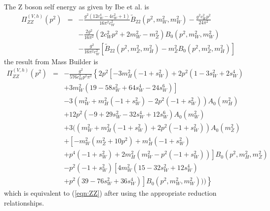\documentclass[11pt]{article}
\newcommand{\mb}{\textsf{Mass Builder} }
\begin{document}
The Z boson self energy as given by Ibe et al. \cite{Ibe2013a} is
{
\begin{eqnarray}
\Pi_{ZZ}^{(V,h)}(p^2) &=& 
-\frac{ g^2 (12c_W^4 - 4c_W^2 + 1) }{16\pi^2 c_W^2}
\tilde B_{22}(p^2, m_W^2, m_W^2) 
-\frac{ g^2 c_W^2 p^2 }{24\pi^2} \nonumber \\
&& -\frac{2g^2}{16\pi^2}(2c_W^2 p^2 + 2m_W^2 - m_Z^2)
B_0(p^2, m_W^2, m_W^2) \nonumber \\
&& -\frac{ g^2 }{16\pi^2 c_W^2}
[\tilde B_{22}(p^2, m_Z^2, m_H^2)\label{eqn:ZZ}
-m_Z^2 B_0(p^2, m_Z^2, m_H^2) ]
\end{eqnarray}
}
the result from \mb is
{
\begin{eqnarray}
\Pi_{ZZ}^{(V,h)}(p^2) &=& 
-\frac{ g^2} {576 c_W^4 p^2 \pi^2}\left\{
2 p^2 \left[-3 m_H^2 (-1 + s_W^2) + 2 p^2 (1 - 3 s_W^2 + 2 s_W^4) \right. \right.\nonumber\\
&& \left.+ 3 m_W^2 (19 - 58 s_W^2 + 64 s_W^4 - 24 s_W^6)\right] \nonumber\\
&&- 3 (m_W^2 + m_H^2 (-1 + s_W^2) - 2 p^2 (-1 + s_W^2)) A_0\left(m_H^2\right)  \nonumber\\
 &&  + 12 p^2 (-9 + 29 s_W^2 - 32 s_W^4 + 12 s_W^6) A_0\left(m_W^2\right)  \nonumber\\
   && +3 ((m_W^2 + m_H^2 (-1 + s_W^2) + 2 p^2 (-1 + s_W^2)) A_0\left(m_Z^2\right)  \nonumber\\
   &&+ \left[-m_W^2 (m_Z^2 + 10 p^2) + m_H^4 (-1 + s_W^2)\right.  \nonumber\\
   && \left. +     p^4 (-1 + s_W^2) + 2 m_H^2 (m_W^2 - p^2 (-1 + s_W^2))\right] B_0\left(p^2, m_H^2, m_Z^2\right)  \nonumber\\
&&   -    p^2 (-1 + s_W^2) \left[4 m_W^2 (15 - 32 s_W^2 + 12 s_W^4)\right.  \nonumber\\
&&  \left.      \left. +  p^2 (39 - 76 s_W^2 + 36 s_W^4)\right] B_0\left(p^2, m_W^2, m_W^2\right)))\right\}
\end{eqnarray}
}
which is equivalent to (\ref{eqn:ZZ}) after using the appropriate reduction relationships.
\end{document}
